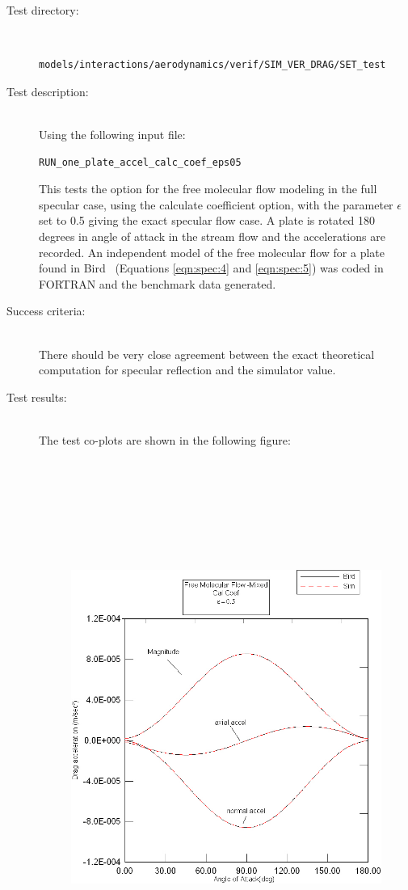 \label{test:mfm}
\begin{description}
\item[Test directory:] \
\begin{verbatim}models/interactions/aerodynamics/verif/SIM_VER_DRAG/SET_test\end{verbatim}
\item[Test description:] \ \\
Using the following input file:
\begin{verbatim}RUN_one_plate_accel_calc_coef_eps05\end{verbatim}
This tests the option for the free molecular
flow modeling in the full specular case, using the calculate coefficient
option,
with the parameter $\epsilon$ set to 0.5 giving
the exact specular flow case. A plate is rotated 180 degrees in angle
of attack in the stream flow and the accelerations are recorded.  An
independent model of the free molecular flow for a plate found in Bird~\cite{Bird}
(Equations \ref{eqn:spec:4} and \ref{eqn:spec:5})
was coded in FORTRAN and the benchmark
data generated.
\item[Success criteria:] \ \\
There should be very close agreement between the exact theoretical
computation for specular reflection and the simulator value.
\item[Test results:] \ \\
The test co-plots are shown in the following figure:
\begin{figure}[hbpt]
\includegraphics [height=175mm]{figs/mixed_cc.jpg}

\end{figure}
\end{description}
